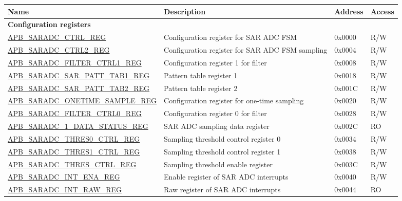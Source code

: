 \begin{longtable}{ | p{7cm} | p{5.2cm} | p{1.3cm} | p{1cm} | }
\hline\rowcolor{lightgray}
Name & Description & Address & Access \\ \hline
\endhead
\multicolumn{4}{|l|}{\textbf{Configuration registers}} \\ \hline
\hyperref[regdesc:APBSARADCCTRLREG]{APB\_SARADC\_CTRL\_REG} & Configuration register for SAR ADC FSM & 0x0000 & R/W \\ \hline
\hyperref[regdesc:APBSARADCCTRL2REG]{APB\_SARADC\_CTRL2\_REG} & Configuration register for SAR ADC FSM sampling & 0x0004 & R/W \\ \hline
\hyperref[regdesc:APBSARADCFILTERCTRL1REG]{APB\_SARADC\_FILTER\_CTRL1\_REG} & Configuration register 1 for filter & 0x0008 & R/W \\ \hline
\hyperref[regdesc:APBSARADCSARPATTTAB1REG]{APB\_SARADC\_SAR\_PATT\_TAB1\_REG} & Pattern table register 1 & 0x0018 & R/W \\ \hline
\hyperref[regdesc:APBSARADCSARPATTTAB2REG]{APB\_SARADC\_SAR\_PATT\_TAB2\_REG} & Pattern table register 2 & 0x001C & R/W \\ \hline
\hyperref[regdesc:APBSARADCONETIMESAMPLEREG]{APB\_SARADC\_ONETIME\_SAMPLE\_REG} & Configuration register for one-time sampling & 0x0020 & R/W \\ \hline
\hyperref[regdesc:APBSARADCFILTERCTRL0REG]{APB\_SARADC\_FILTER\_CTRL0\_REG} & Configuration register 0 for filter & 0x0028 & R/W \\ \hline
\hyperref[regdesc:APBSARADCSAR1DATASTATUSREG]{APB\_SARADC\_1\_DATA\_STATUS\_REG} & SAR ADC sampling data register & 0x002C & RO \\ \hline
\hyperref[regdesc:APBSARADCTHRES0CTRLREG]{APB\_SARADC\_THRES0\_CTRL\_REG} & Sampling threshold control register 0 & 0x0034 & R/W \\ \hline
\hyperref[regdesc:APBSARADCTHRES1CTRLREG]{APB\_SARADC\_THRES1\_CTRL\_REG} & Sampling threshold control register 1 & 0x0038 & R/W \\ \hline
\hyperref[regdesc:APBSARADCTHRESCTRLREG]{APB\_SARADC\_THRES\_CTRL\_REG} & Sampling threshold enable register & 0x003C & R/W \\ \hline
\hyperref[regdesc:APBSARADCINTENAREG]{APB\_SARADC\_INT\_ENA\_REG} & Enable register of SAR ADC interrupts & 0x0040 & R/W \\ \hline
\hyperref[regdesc:APBSARADCINTRAWREG]{APB\_SARADC\_INT\_RAW\_REG} & Raw register of SAR ADC interrupts & 0x0044 & RO \\ \hline

\end{longtable}
